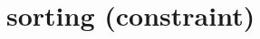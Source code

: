 \label{sorting}
\hypertarget{sorting}{}

\section{sorting (constraint)}\label{sorting:sortingconstraint}\hypertarget{sorting:sortingconstraint}{}
